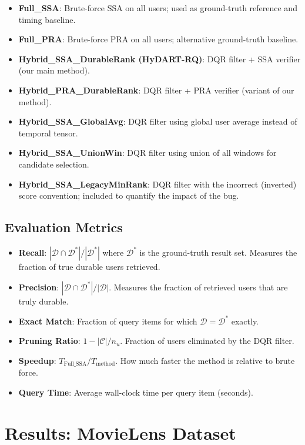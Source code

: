 \begin{itemize}
  \item \textbf{Full\_SSA}: Brute-force SSA on all users; used as ground-truth reference and timing baseline.
  \item \textbf{Full\_PRA}: Brute-force PRA on all users; alternative ground-truth baseline.
  \item \textbf{Hybrid\_SSA\_DurableRank (HyDART-RQ)}: DQR filter + SSA verifier (our main method).
  \item \textbf{Hybrid\_PRA\_DurableRank}: DQR filter + PRA verifier (variant of our method).
  \item \textbf{Hybrid\_SSA\_GlobalAvg}: DQR filter using global user average instead of temporal tensor.
  \item \textbf{Hybrid\_SSA\_UnionWin}: DQR filter using union of all windows for candidate selection.
  \item \textbf{Hybrid\_SSA\_LegacyMinRank}: DQR filter with the incorrect (inverted) score convention; included to quantify the impact of the bug.
\end{itemize}

\subsection{Evaluation Metrics}

\begin{itemize}
  \item \textbf{Recall}: $|\mathcal{D} \cap \mathcal{D}^*| / |\mathcal{D}^*|$ where $\mathcal{D}^*$ is the ground-truth result set. Measures the fraction of true durable users retrieved.
  \item \textbf{Precision}: $|\mathcal{D} \cap \mathcal{D}^*| / |\mathcal{D}|$. Measures the fraction of retrieved users that are truly durable.
  \item \textbf{Exact Match}: Fraction of query items for which $\mathcal{D} = \mathcal{D}^*$ exactly.
  \item \textbf{Pruning Ratio}: $1 - |\mathcal{C}| / n_u$. Fraction of users eliminated by the DQR filter.
  \item \textbf{Speedup}: $T_{\text{Full\_SSA}} / T_{\text{method}}$. How much faster the method is relative to brute force.
  \item \textbf{Query Time}: Average wall-clock time per query item (seconds).
\end{itemize}

\section{Results: MovieLens Dataset}


